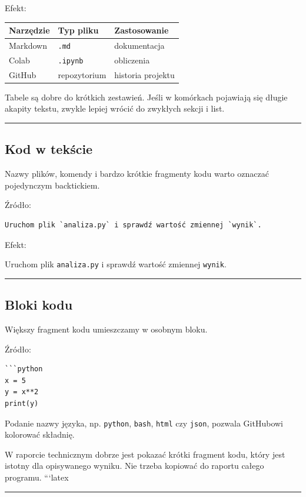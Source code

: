 \documentclass[11pt, a4paper]{article}
\begin{document}
Efekt:

\begin{table}[h!]
\centering
\begin{tabular}{lll}
\toprule
\textbf{Narzędzie} & \textbf{Typ pliku} & \textbf{Zastosowanie} \\
\midrule
Markdown & \texttt{.md} & dokumentacja \\
Colab & \texttt{.ipynb} & obliczenia \\
GitHub & repozytorium & historia projektu \\
\bottomrule
\end{tabular}
\end{table}

Tabele są dobre do krótkich zestawień. Jeśli w komórkach pojawiają się długie akapity tekstu, zwykle lepiej wrócić do zwykłych sekcji i list.

\medskip\hrule\medskip

\subsection{Kod w tekście}

Nazwy plików, komendy i bardzo krótkie fragmenty kodu warto oznaczać pojedynczym backtickiem.

Źródło:

\begin{verbatim}
Uruchom plik `analiza.py` i sprawdź wartość zmiennej `wynik`.
\end{verbatim}

Efekt:

Uruchom plik \texttt{analiza.py} i sprawdź wartość zmiennej \texttt{wynik}.

\medskip\hrule\medskip

\subsection{Bloki kodu}

Większy fragment kodu umieszczamy w osobnym bloku.

Źródło:

\begin{verbatim}
```python
x = 5
y = x**2
print(y)
\end{verbatim}

Podanie nazwy języka, np. \texttt{python}, \texttt{bash}, \texttt{html} czy \texttt{json}, pozwala GitHubowi kolorować składnię.

W raporcie technicznym dobrze jest pokazać krótki fragment kodu, który jest istotny dla opisywanego wyniku. Nie trzeba kopiować do raportu całego programu.
```latex
\medskip\hrule\medskip
\end{document}
